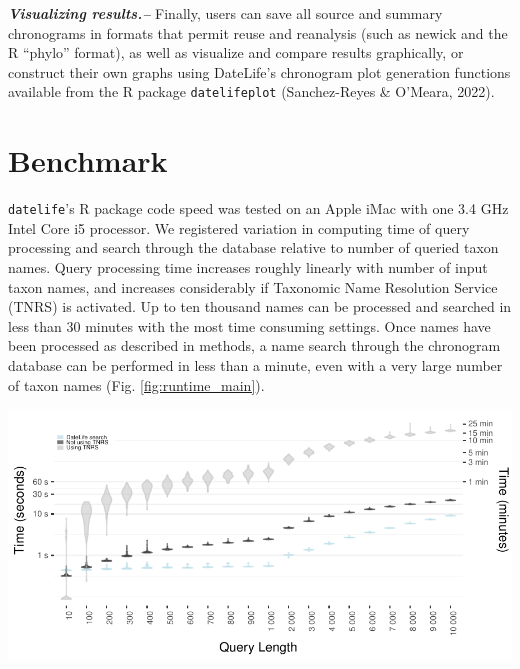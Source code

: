 \documentclass[english,man]{apa6}
\begin{document}
\emph{\textbf{Visualizing results.--}}
Finally, users can save all source and summary chronograms in formats that permit reuse and reanalysis (such as newick and the R \enquote{phylo} format), as well as visualize and compare results graphically, or construct their own graphs using DateLife's chronogram plot generation functions available from the R package \texttt{datelifeplot} (Sanchez-Reyes \& O'Meara, 2022).

\newpage

\hypertarget{benchmark}{%
\section{Benchmark}\label{benchmark}}

\texttt{datelife}'s R package code speed was tested on an Apple iMac
with one 3.4 GHz Intel Core i5 processor.
We registered variation in computing time of query processing and search through the database relative to number of queried taxon names.
Query processing time increases roughly linearly with number of input taxon names, and
increases considerably if Taxonomic Name Resolution Service (TNRS) is activated.
Up to ten thousand names can be processed and searched in less than 30 minutes with the most time consuming settings.
Once names have been processed as described in methods, a name search through the chronogram database can be performed in less than a minute, even with a very large number of taxon names (Fig. \ref{fig:runtime_main}).

\includegraphics{../figures/fig_runtime_main.pdf}
\label{fig:runtime_main}
\end{document}
